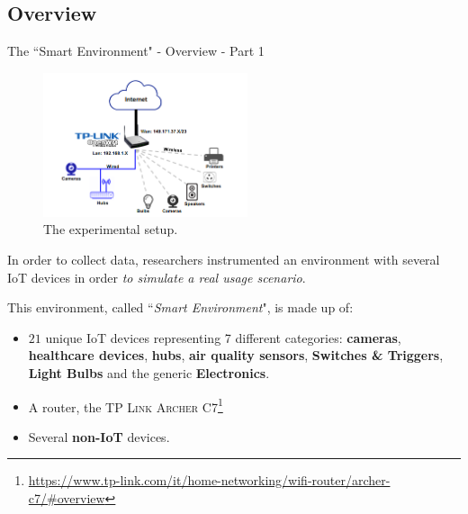 \documentclass[10pt]{beamer}
\begin{document}
\subsection{Overview}
\begin{frame}{The ``Smart Environment" - Overview - Part 1}


\begin{figure}
\centering
\includegraphics[width=170pt]{Topology.png}
\caption{The experimental setup.}
\end{figure}

In order to collect data, researchers instrumented an environment with several IoT devices in order \textit{to simulate a real usage scenario}. 

This environment, called ``\textit{Smart Environment}", is made up of: 

\begin{itemize}
\justifying
\item $21$ unique IoT devices representing 7 different categories: \textbf{cameras}, \textbf{healthcare devices}, \textbf{hubs}, \textbf{air quality sensors}, \textbf{Switches \& Triggers}, \textbf{Light Bulbs} and the generic \textbf{Electronics}.
\item A router, the \textsc{TP Link Archer C7}\footnote{\tiny\url{https://www.tp-link.com/it/home-networking/wifi-router/archer-c7/\#overview}}

\item Several \textbf{non-IoT} devices.

\end{itemize}

\end{frame} 
\end{document}
